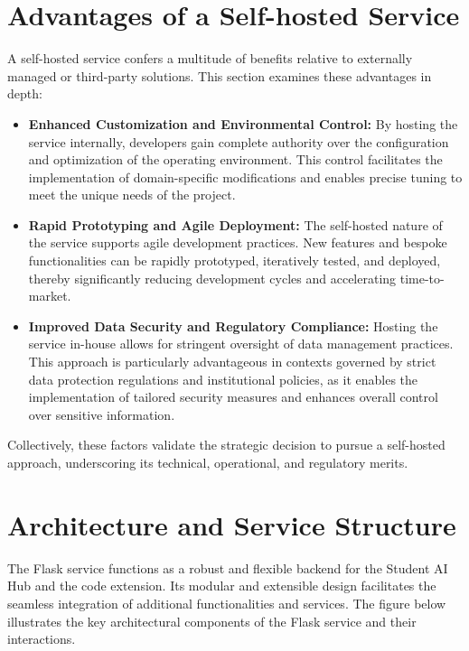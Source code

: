 \section{Advantages of a Self-hosted Service}
A self-hosted service confers a multitude of benefits relative to externally managed or third-party solutions. This section examines these advantages in depth:
\begin{itemize}
    \item \textbf{Enhanced Customization and Environmental Control:} By hosting the service internally, developers gain complete authority over the configuration and optimization of the operating environment. This control facilitates the implementation of domain-specific modifications and enables precise tuning to meet the unique needs of the project.
    \item \textbf{Rapid Prototyping and Agile Deployment:} The self-hosted nature of the service supports agile development practices. New features and bespoke functionalities can be rapidly prototyped, iteratively tested, and deployed, thereby significantly reducing development cycles and accelerating time-to-market.
    \item \textbf{Improved Data Security and Regulatory Compliance:} Hosting the service in-house allows for stringent oversight of data management practices. This approach is particularly advantageous in contexts governed by strict data protection regulations and institutional policies, as it enables the implementation of tailored security measures and enhances overall control over sensitive information.
\end{itemize}
Collectively, these factors validate the strategic decision to pursue a self-hosted approach, underscoring its technical, operational, and regulatory merits.


\section{Architecture and Service Structure}

The Flask service functions as a robust and flexible backend for the Student AI Hub and the code extension. Its modular and extensible design facilitates the seamless integration of additional functionalities and services. The figure below illustrates the key architectural components of the Flask service and their interactions.

